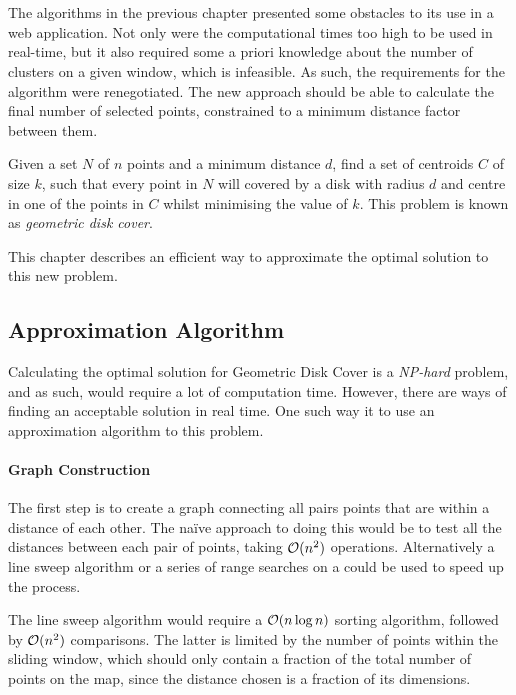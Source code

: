 \chapter{}
\label{chap:approx}

The algorithms in the previous chapter presented some obstacles to its use in a web application. Not only were the computational times too high to be used in real-time, but it also required some a priori knowledge about the number of clusters on a given window, which is infeasible. As such, the requirements for the algorithm were renegotiated. The new approach should be able to calculate the final number of selected points, constrained to a minimum distance factor between them.

Given a set $N$ of $n$ points and a minimum distance $d$, find a set of centroids $C$ of size $k$, such that every point in $N$ will covered by a disk with radius $d$ and centre in one of the points in $C$ whilst minimising the value of $k$. This problem is known as \emph{geometric disk cover}\cite{geodisk}.

This chapter describes an efficient way to approximate the optimal solution to this new problem.

\section{Approximation Algorithm}
Calculating the optimal solution for Geometric Disk Cover is a \emph{NP-hard} problem, and as such, would require a lot of computation time. However, there are ways of finding an acceptable solution in real time. One such way it to use an approximation algorithm to this problem.

\subsubsection*{Graph Construction}
The first step is to create a graph connecting all pairs points that are within a distance of each other. The naïve approach to doing this would be to test all the distances between each pair of points, taking $\mathcal{O}(n^2)$ operations. Alternatively a line sweep algorithm or a series of range searches on a \kdtree could be used to speed up the process.

The line sweep algorithm would require a $\mathcal{O}(n \log{n})$ sorting algorithm, followed by $\mathcal{O}(n^2)$ comparisons. The latter is limited by the number of points within the sliding window, which should only contain a fraction of the total number of points on the map, since the distance chosen is a fraction of its dimensions.

